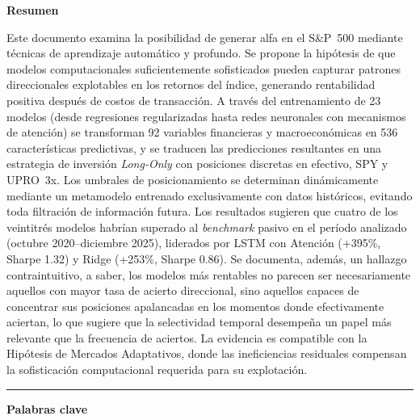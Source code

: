 ﻿\documentclass[11pt,a4paper]{article}
\begin{document}
\begin{minipage}{0.95\textwidth}
\small
{}
\textbf{Resumen}

\vspace{0.3cm}

Este documento examina la posibilidad de generar alfa en el S\&P~500 mediante t\'ecnicas de aprendizaje autom\'atico y profundo. Se propone la hip\'otesis de que modelos computacionales suficientemente sofisticados pueden capturar patrones direccionales explotables en los retornos del \'indice, generando rentabilidad positiva despu\'es de costos de transacci\'on. A trav\'es del entrenamiento de 23 modelos (desde regresiones regularizadas hasta redes neuronales con mecanismos de atenci\'on) se transforman 92 variables financieras y macroecon\'omicas en 536 caracter\'isticas predictivas, y se traducen las predicciones resultantes en una estrategia de inversi\'on \textit{Long-Only} con posiciones discretas en efectivo, SPY y UPRO~3x. Los umbrales de posicionamiento se determinan din\'amicamente mediante un metamodelo entrenado exclusivamente con datos hist\'oricos, evitando toda filtraci\'on de informaci\'on futura. Los resultados sugieren que cuatro de los veintitr\'es modelos habr\'ian superado al \textit{benchmark} pasivo en el per\'iodo analizado (octubre 2020--diciembre 2025), liderados por LSTM con Atenci\'on (+395\%, Sharpe 1.32) y Ridge (+253\%, Sharpe 0.86). Se documenta, adem\'as, un hallazgo contraintuitivo, a saber, los modelos m\'as rentables no parecen ser necesariamente aquellos con mayor tasa de acierto direccional, sino aquellos capaces de concentrar sus posiciones apalancadas en los momentos donde efectivamente aciertan, lo que sugiere que la selectividad temporal desempe\~na un papel m\'as relevante que la frecuencia de aciertos. La evidencia es compatible con la Hip\'otesis de Mercados Adaptativos, donde las ineficiencias residuales compensan la sofisticaci\'on computacional requerida para su explotaci\'on.

\end{minipage}

\vspace{0.8cm}

\begin{center}
\noindent\rule{0.9\textwidth}{0.5pt}
\end{center}

\newpage

\vspace*{0.5cm}

\textbf{\large Palabras clave}
\end{document}

